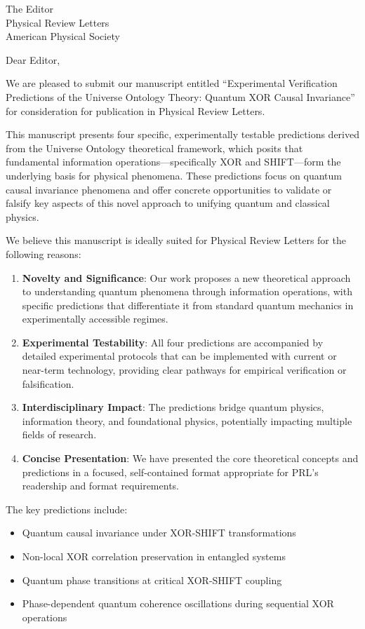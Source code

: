 \documentclass[11pt,letterpaper]{letter}
\date{\today}
\begin{document}
\begin{letter}{The Editor\\Physical Review Letters\\American Physical Society}

\opening{Dear Editor,}

We are pleased to submit our manuscript entitled ``Experimental Verification Predictions of the Universe Ontology Theory: Quantum XOR Causal Invariance'' for consideration for publication in Physical Review Letters.

This manuscript presents four specific, experimentally testable predictions derived from the Universe Ontology theoretical framework, which posits that fundamental information operations—specifically XOR and SHIFT—form the underlying basis for physical phenomena. These predictions focus on quantum causal invariance phenomena and offer concrete opportunities to validate or falsify key aspects of this novel approach to unifying quantum and classical physics.

We believe this manuscript is ideally suited for Physical Review Letters for the following reasons:

\begin{enumerate}
\item \textbf{Novelty and Significance}: Our work proposes a new theoretical approach to understanding quantum phenomena through information operations, with specific predictions that differentiate it from standard quantum mechanics in experimentally accessible regimes.

\item \textbf{Experimental Testability}: All four predictions are accompanied by detailed experimental protocols that can be implemented with current or near-term technology, providing clear pathways for empirical verification or falsification.

\item \textbf{Interdisciplinary Impact}: The predictions bridge quantum physics, information theory, and foundational physics, potentially impacting multiple fields of research.

\item \textbf{Concise Presentation}: We have presented the core theoretical concepts and predictions in a focused, self-contained format appropriate for PRL's readership and format requirements.
\end{enumerate}

The key predictions include:
\begin{itemize}
\item Quantum causal invariance under XOR-SHIFT transformations
\item Non-local XOR correlation preservation in entangled systems
\item Quantum phase transitions at critical XOR-SHIFT coupling
\item Phase-dependent quantum coherence oscillations during sequential XOR operations
\end{itemize}


\end{letter}
\end{document}
